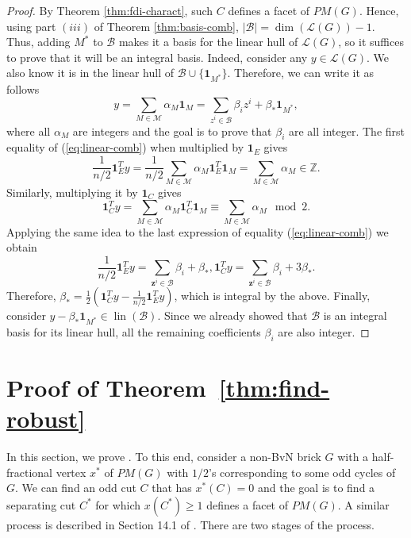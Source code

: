 \documentclass[11pt]{article}
\DeclareMathOperator{\lin}{lin}
\newcommand{\1}{\mathbf{1}}
\newcommand{\0}{\mathbf{0}}
\newcommand{\zB}{\mathcal B}
\newcommand{\zL}{\mathcal L}
\newcommand{\Z}{\mathbb{Z}}
\begin{document}
\begin{proof}
    By Theorem \ref{thm:fdi-charact}, such $C$ defines a facet of $PM(G)$. Hence, using part $(iii)$ of Theorem \ref{thm:basis-comb}, $|\zB|=\dim(\zL(G))-1$. Thus, adding $M^*$ to $\zB$ makes it a basis for the linear hull of $\zL(G)$, so it suffices to prove that it will be an integral basis.
    Indeed, consider any $y \in \zL(G)$. We also know it is in the linear hull of $\zB\cup\{\mathbf{1}_{M^*}\}$. Therefore, we can write it as follows \begin{equation}\label{eq:linear-comb}
        y = \sum_{M\in \mathcal{M}} \alpha_M \mathbf{1}_M = \sum_{z^i\in \zB} \beta_i z^i+\beta_* \mathbf{1}_{M^*},
    \end{equation} where all $\alpha_M$ are integers and the goal is to prove that $\beta_i$ are all integer.
    The first equality of (\ref{eq:linear-comb}) when multiplied by $\textbf{1}_{E}$ gives \begin{equation*}
        \frac{1}{n/2} \textbf{1}^T_{E} y = \frac{1}{n/2}\sum_{M\in \mathcal{M}} \alpha_M \textbf{1}^T_{E}\mathbf{1}_M=\sum_{M\in \mathcal{M}} \alpha_M \in \Z.
    \end{equation*} Similarly, multiplying it by $\textbf{1}_C$ gives \begin{equation*}
        \textbf{1}^T_{C} y = \sum_{M\in \mathcal{M}} \alpha_M \textbf{1}^T_{C}\mathbf{1}_M\equiv \sum_{M\in \mathcal{M}} \alpha_M \mod 2.
    \end{equation*} Applying the same idea to the last expression of equality (\ref{eq:linear-comb}) we obtain \begin{equation*}
        \frac{1}{n/2} \textbf{1}^T_{E} y =\sum_{\mathbf{z}^i \in \zB} \beta_i + \beta_*, \textbf{1}^T_{C} y = \sum_{\mathbf{z}^i \in \zB} \beta_i + 3\beta_*.
    \end{equation*} Therefore, $\beta_*=\frac{1}{2} (\textbf{1}^T_{C} y-\frac{1}{n/2} \textbf{1}^T_{E} y)$, which is integral by the above.
    Finally, consider $y-\beta_* \mathbf{1}_{M^*} \in \lin(\zB)$. Since we already showed that $\zB$ is an integral basis for its linear hull, all the remaining coefficients $\beta_i$ are also integer.
\end{proof}

\section{Proof of Theorem~\ref{thm:find-robust}}\label{sec:sep-find}

In this section, we prove . To this end, consider a non-BvN brick $G$ with a half-fractional vertex $x^*$ of $PM(G)$ with $1/2$'s corresponding to some odd cycles of $G$. We can find an odd cut $C$ that has $x^*(C)=0$ and the goal is to find a separating cut $C^*$ for which $x(C^*) \geq 1$ defines a facet of $PM(G)$. A similar process is described in Section 14.1 of \cite{Lucchesi2024}. There are two stages of the process.
\end{document}
